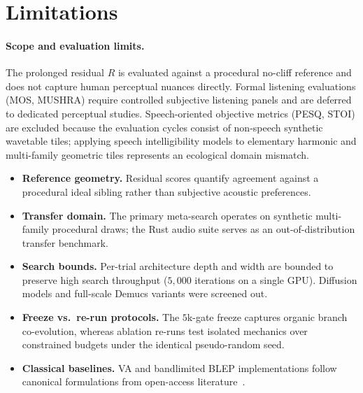 \section{Limitations}
\label{sec:limitations}

\paragraph{Scope and evaluation limits.}
The prolonged residual $R$ is evaluated against a procedural no-cliff reference and does not capture human perceptual nuances directly.
Formal listening evaluations (MOS, MUSHRA) require controlled subjective listening panels and are deferred to dedicated perceptual studies.
Speech-oriented objective metrics (PESQ, STOI) are excluded because the evaluation cycles consist of non-speech synthetic wavetable tiles; applying speech intelligibility models to elementary harmonic and multi-family geometric tiles represents an ecological domain mismatch.

\begin{itemize}
  \item \textbf{Reference geometry.} Residual scores quantify agreement against a procedural ideal sibling rather than subjective acoustic preferences.
  \item \textbf{Transfer domain.} The primary meta-search operates on synthetic multi-family procedural draws; the Rust audio suite serves as an out-of-distribution transfer benchmark.
  \item \textbf{Search bounds.} Per-trial architecture depth and width are bounded to preserve high search throughput ($5{,}000$ iterations on a single GPU). Diffusion models and full-scale Demucs variants were screened out.
  \item \textbf{Freeze vs.\ re-run protocols.} The $5$k-gate freeze captures organic branch co-evolution, whereas ablation re-runs test isolated mechanics over constrained budgets under the identical pseudo-random seed.
  \item \textbf{Classical baselines.} VA and bandlimited BLEP implementations follow canonical formulations from open-access literature~\cite{stilson1996,nam2009polyblep,esqueda2016blamp}.
\end{itemize}



